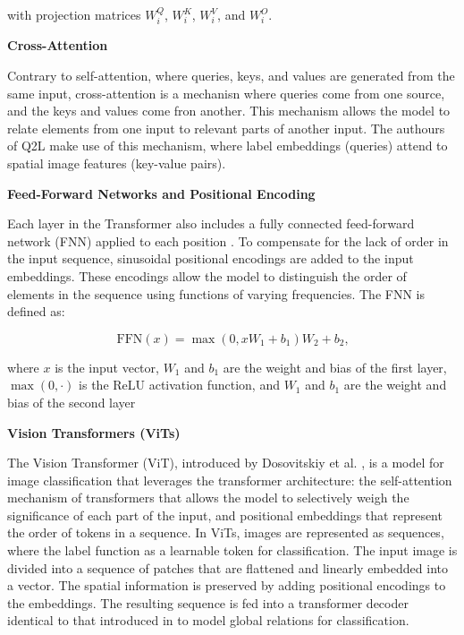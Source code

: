 \documentclass[lettersize,journal]{IEEEtran}
\renewcommand{\paragraph}[1]{%
  \vspace{1.5ex}\textbf{#1}\quad
}
\begin{document}
\noindent with projection matrices $W_i^Q$, $W_i^K$, $W_i^V$, and $W_i^O$.

\paragraph{Cross-Attention}
Contrary to self-attention, where queries, keys, and values are generated from the same input, cross-attention is a mechanisn where queries come from one source, and the keys and values come fron another. This mechanism allows the model to relate elements from one input to relevant parts of another input. The authours of Q2L \cite{Query2Label} make use of this mechanism, where label embeddings (queries) attend to spatial image features (key-value pairs).



\paragraph{Feed-Forward Networks and Positional Encoding}
Each layer in the Transformer also includes a fully connected feed-forward network (FNN) applied to each position \cite{vaswani2023attentionneed}. To compensate for the lack of order in the input sequence, sinusoidal positional encodings are added to the input embeddings. These encodings allow the model to distinguish the order of elements in the sequence using functions of varying frequencies. The FNN is defined as:

\begin{equation}
    \label{eq:ffn}
    \text{FFN}(x) = \max(0, xW_1 + b_1)W_2 + b_2\text{,}
\end{equation}

where $x$ is the input vector, $W_1$ and $b_1$ are the weight and bias of the first layer, $\max(0,\cdot)$ is the ReLU activation function, and $W_1$ and $b_1$ are the weight and bias of the second layer

\paragraph{Vision Transformers (ViTs)}
The Vision Transformer (ViT), introduced by Dosovitskiy et al. \cite{dosovitskiy2021imageworth16x16words}, is a model for image classification that leverages the transformer architecture: the self-attention mechanism of transformers that allows the model to selectively weigh the significance of each part of the input, and positional embeddings that represent the order of tokens in a sequence. In ViTs, images are represented as sequences, where the label function as a learnable token for classification. The input image is divided into a sequence of patches that are flattened and linearly embedded into a vector. The spatial information is preserved by adding positional encodings to the embeddings. The resulting sequence is fed into a transformer decoder identical to that introduced in \cite{vaswani2023attentionneed} to model global relations for classification.
\end{document}
